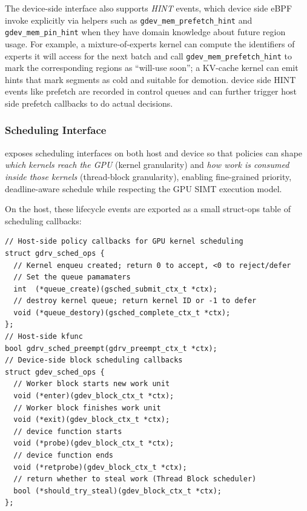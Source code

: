 The device-side interface also supports \emph{HINT} events, which device side eBPF 
invoke explicitly via helpers such as \texttt{gdev\_mem\_prefetch\_hint} and \texttt{gdev\_mem\_pin\_hint} when they have domain knowledge about future region usage. For
example, a mixture-of-experts kernel can compute the identifiers of experts it
will access for the next batch and call \texttt{gdev\_mem\_prefetch\_hint} to mark
the corresponding regions as ``will-use soon'';
a KV-cache kernel can emit hints that mark segments as cold and suitable for
demotion. device side HINT events like prefetch are recorded in control queues and can further trigger host side prefetch callbacks to do actual decisions.

\subsubsection{Scheduling Interface}
\label{sec:design-sched}

\sys exposes scheduling interfaces on both host and device so that policies can shape
\emph{which kernels reach the GPU} (kernel granularity) and \emph{how work is consumed inside those kernels} (thread-block granularity), enabling fine-grained priority, deadline-aware schedule while respecting the GPU SIMT execution model.

On the host, these lifecycle events are exported as a small struct-ops table of
scheduling callbacks:

\begin{verbatim}
// Host-side policy callbacks for GPU kernel scheduling
struct gdrv_sched_ops {
  // Kernel enqueu created; return 0 to accept, <0 to reject/defer
  // Set the queue pamamaters
  int  (*queue_create)(gsched_submit_ctx_t *ctx);
  // destroy kernel queue; return kernel ID or -1 to defer
  void (*queue_destory)(gsched_complete_ctx_t *ctx);
};
// Host-side kfunc
bool gdrv_sched_preempt(gdrv_preempt_ctx_t *ctx);
// Device-side block scheduling callbacks
struct gdev_sched_ops {
  // Worker block starts new work unit
  void (*enter)(gdev_block_ctx_t *ctx);
  // Worker block finishes work unit
  void (*exit)(gdev_block_ctx_t *ctx);
  // device function starts
  void (*probe)(gdev_block_ctx_t *ctx);
  // device function ends
  void (*retprobe)(gdev_block_ctx_t *ctx);
  // return whether to steal work (Thread Block scheduler)
  bool (*should_try_steal)(gdev_block_ctx_t *ctx);
};
\end{verbatim}

